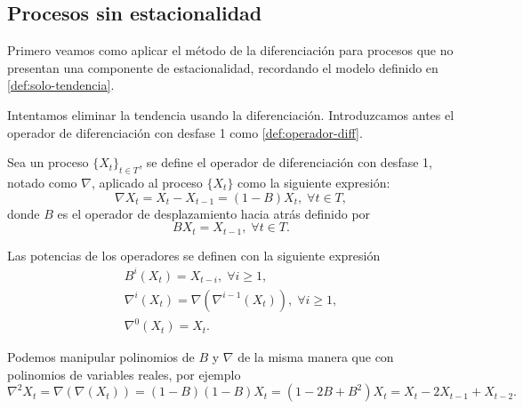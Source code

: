 \subsection{Procesos sin estacionalidad}

Primero veamos como aplicar el método de la diferenciación para procesos que no presentan una componente de estacionalidad, recordando el modelo definido en \autoref{def:solo-tendencia}.

Intentamos eliminar la tendencia usando la diferenciación. Introduzcamos antes  el operador de diferenciación con desfase 1 como \autoref{def:operador-diff}.

\begin{definicion}
Sea un proceso $\{X_t\}_{t \in T}$, se define el operador de diferenciación con desfase 1, notado como $\nabla$, aplicado al proceso $\{X_t\}$ como la siguiente expresión:
$$\nabla X_t = X_t - X_{t - 1} = (1 - B)X_t, \; \forall t \in T,$$
donde $B$ es el operador de desplazamiento hacia atrás definido por
$$BX_t = X_{t-1}, \; \forall t \in T.$$
\label{def:operador-diff}
\end{definicion}

Las potencias de los operadores se definen con la siguiente expresión
\begin{gather*}
  B^i(X_t) = X_{t-i}, \; \forall i \geq 1, \\
  \nabla^i(X_t) = \nabla(\nabla^{i-1}(X_t)), \; \forall i \geq 1, \\
  \nabla^0(X_t) = X_t.
\label{eq:potencias-op}
\end{gather*}

Podemos manipular polinomios de $B$ y $\nabla$ de la misma manera que con polinomios de variables reales, por ejemplo
\begin{equation*}
  \nabla^2X_t = \nabla(\nabla(X_t)) = (1-B)(1-B)X_t = (1 - 2B + B^2)X_t = X_t - 2X_{t-1} + X_{t-2}.
  \label{eq:diff-ej}
\end{equation*}

